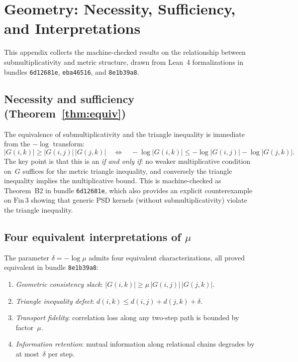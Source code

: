 \documentclass[11pt,a4paper]{article}
\theoremstyle{definition}
\theoremstyle{remark}
\begin{document}
\section{Geometry: Necessity, Sufficiency, and Interpretations}\label{app:geometry}

This appendix collects the machine-checked results on the relationship between submultiplicativity and metric structure, drawn from Lean~4 formalizations in bundles \texttt{6d12681e}, \texttt{eba46516}, and \texttt{8e1b39a8}.

\subsection{Necessity and sufficiency (Theorem~\ref{thm:equiv})}

The equivalence of submultiplicativity and the triangle inequality is immediate from the $-\log$ transform:
\[
|G(i,k)| \ge |G(i,j)|\,|G(j,k)| \quad\Longleftrightarrow\quad -\log|G(i,k)| \le -\log|G(i,j)| - \log|G(j,k)|.
\]
The key point is that this is an \emph{if and only if}: no weaker multiplicative condition on~$G$ suffices for the metric triangle inequality, and conversely the triangle inequality implies the multiplicative bound. This is machine-checked as Theorem~B2 in bundle \texttt{6d12681e}, which also provides an explicit counterexample on $\mathrm{Fin}\,3$ showing that generic PSD kernels (without submultiplicativity) violate the triangle inequality.

\subsection{Four equivalent interpretations of $\mu$}

The parameter $\delta = -\log\mu$ admits four equivalent characterizations, all proved equivalent in bundle \texttt{8e1b39a8}:
\begin{enumerate}[nosep]
  \item \emph{Geometric consistency slack}: $|G(i,k)| \ge \mu\,|G(i,j)|\,|G(j,k)|$.
  \item \emph{Triangle inequality defect}: $d(i,k) \le d(i,j) + d(j,k) + \delta$.
  \item \emph{Transport fidelity}: correlation loss along any two-step path is bounded by factor~$\mu$.
  \item \emph{Information retention}: mutual information along relational chains degrades by at most~$\delta$ per step.
\end{enumerate}
\end{document}

